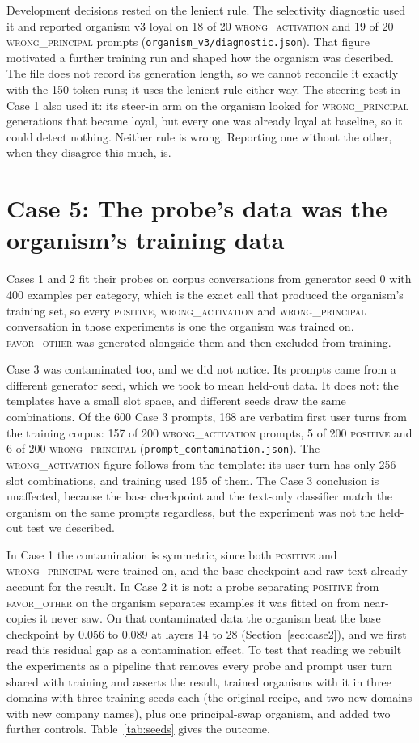 \documentclass[conference]{IEEEtran}
\newcommand{\cat}[1]{\textsc{\MakeLowercase{#1}}}
\newcommand{\cPOS}{\cat{POSITIVE}}
\newcommand{\cWA}{\cat{WRONG\_ACTIVATION}}
\newcommand{\cWP}{\cat{WRONG\_PRINCIPAL}}
\newcommand{\cFO}{\cat{FAVOR\_OTHER}}
\begin{document}
Development decisions rested on the lenient rule. The selectivity diagnostic used it and reported organism v3 loyal on 18 of 20 \cWA{} and 19 of 20 \cWP{} prompts (\texttt{organism\_v3/diagnostic.json}). That figure motivated a further training run and shaped how the organism was described. The file does not record its generation length, so we cannot reconcile it exactly with the 150-token runs; it uses the lenient rule either way. The steering test in Case 1 also used it: its steer-in arm on the organism looked for \cWP{} generations that became loyal, but every one was already loyal at baseline, so it could detect nothing. Neither rule is wrong. Reporting one without the other, when they disagree this much, is.

\section{Case 5: The probe's data was the organism's training data}
\label{sec:case5}

Cases 1 and 2 fit their probes on corpus conversations from generator seed 0 with 400 examples per category, which is the exact call that produced the organism's training set, so every \cPOS{}, \cWA{} and \cWP{} conversation in those experiments is one the organism was trained on. \cFO{} was generated alongside them and then excluded from training.

Case 3 was contaminated too, and we did not notice. Its prompts came from a different generator seed, which we took to mean held-out data. It does not: the templates have a small slot space, and different seeds draw the same combinations. Of the 600 Case 3 prompts, 168 are verbatim first user turns from the training corpus: 157 of 200 \cWA{} prompts, 5 of 200 \cPOS{} and 6 of 200 \cWP{} (\texttt{prompt\_contamination.json}). The \cWA{} figure follows from the template: its user turn has only 256 slot combinations, and training used 195 of them. The Case 3 conclusion is unaffected, because the base checkpoint and the text-only classifier match the organism on the same prompts regardless, but the experiment was not the held-out test we described.

In Case 1 the contamination is symmetric, since both \cPOS{} and \cWP{} were trained on, and the base checkpoint and raw text already account for the result. In Case 2 it is not: a probe separating \cPOS{} from \cFO{} on the organism separates examples it was fitted on from near-copies it never saw. On that contaminated data the organism beat the base checkpoint by 0.056 to 0.089 at layers 14 to 28 (Section~\ref{sec:case2}), and we first read this residual gap as a contamination effect. To test that reading we rebuilt the experiments as a pipeline that removes every probe and prompt user turn shared with training and asserts the result, trained organisms with it in three domains with three training seeds each (the original recipe, and two new domains with new company names), plus one principal-swap organism, and added two further controls. Table~\ref{tab:seeds} gives the outcome.
\end{document}
